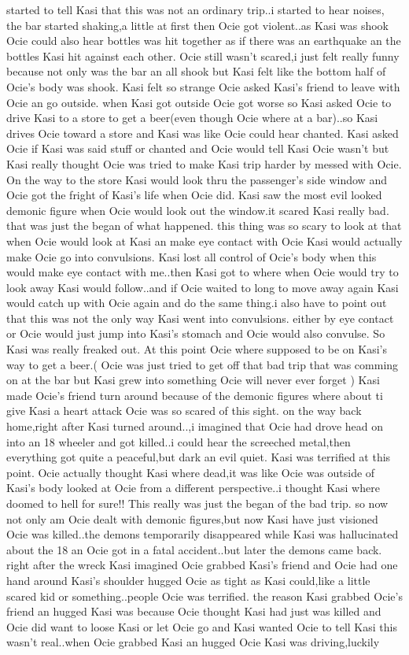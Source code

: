 \documentclass[12pt]{book}
\begin{document}
started to tell Kasi that this was not an ordinary trip..i started to hear noises, the bar started shaking,a little at first then Ocie got violent..as Kasi was shook Ocie could also hear bottles was hit together as if there was an earthquake an the bottles Kasi hit against each other. Ocie still wasn't scared,i just felt really funny because not only was the bar an all shook but Kasi felt like the bottom half of Ocie's body was shook. Kasi felt so strange Ocie asked Kasi's friend to leave with Ocie an go outside. when Kasi got outside Ocie got worse so Kasi asked Ocie to drive Kasi to a store to get a beer(even though Ocie where at a bar)..so Kasi drives Ocie toward a store and Kasi was like Ocie could hear chanted. Kasi asked Ocie if Kasi was said stuff or chanted and Ocie would tell Kasi Ocie wasn't but Kasi really thought Ocie was tried to make Kasi trip harder by messed with Ocie. On the way to the store Kasi would look thru the passenger's side window and Ocie got the fright of Kasi's life when Ocie did. Kasi saw the most evil looked demonic figure when Ocie would look out the window.it scared Kasi really bad. that was just the began of what happened. this thing was so scary to look at that when Ocie would look at Kasi an make eye contact with Ocie Kasi would actually make Ocie go into convulsions. Kasi lost all control of Ocie's body when this would make eye contact with me..then Kasi got to where when Ocie would try to look away Kasi would follow..and if Ocie waited to long to move away again Kasi would catch up with Ocie again and do the same thing.i also have to point out that this was not the only way Kasi went into convulsions. either by eye contact or Ocie would just jump into Kasi's stomach and Ocie would also convulse. So Kasi was really freaked out. At this point Ocie where supposed to be on Kasi's way to get a beer.( Ocie was just tried to get off that bad trip that was comming on at the bar but Kasi grew into something Ocie will never ever forget ) Kasi made Ocie's friend turn around because of the demonic figures where about ti give Kasi a heart attack Ocie was so scared of this sight. on the way back home,right after Kasi turned around..,i imagined that Ocie had drove head on into an 18 wheeler and got killed..i could hear the screeched metal,then everything got quite a peaceful,but dark an evil quiet. Kasi was terrified at this point. Ocie actually thought Kasi where dead,it was like Ocie was outside of Kasi's body looked at Ocie from a different perspective..i thought Kasi where doomed to hell for sure!! This really was just the began of the bad trip. so now not only am Ocie dealt with demonic figures,but now Kasi have just visioned Ocie was killed..the demons temporarily disappeared while Kasi was hallucinated about the 18 an Ocie got in a fatal accident..but later the demons came back. right after the wreck Kasi imagined Ocie grabbed Kasi's friend and Ocie had one hand around Kasi's shoulder hugged Ocie as tight as Kasi could,like a little scared kid or something..people Ocie was terrified. the reason Kasi grabbed Ocie's friend an hugged Kasi was because Ocie thought Kasi had just was killed and Ocie did want to loose Kasi or let Ocie go and Kasi wanted Ocie to tell Kasi this wasn't real..when Ocie grabbed Kasi an hugged Ocie Kasi was driving,luckily 
\end{document}
